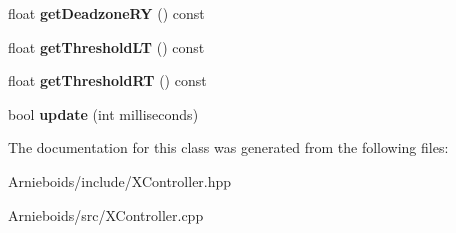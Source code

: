 \begin{DoxyCompactItemize}
\item 
\hypertarget{class_x_controller_abb171d26892efcc9ef5d4109a0e46644}{}float {\bfseries get\+Deadzone\+R\+Y} () const \label{class_x_controller_abb171d26892efcc9ef5d4109a0e46644}

\item 
\hypertarget{class_x_controller_a29521bc4c619301d8448cd9b1fa84bc4}{}float {\bfseries get\+Threshold\+L\+T} () const \label{class_x_controller_a29521bc4c619301d8448cd9b1fa84bc4}

\item 
\hypertarget{class_x_controller_a74406c5161e85934a0a25a11ca44fa96}{}float {\bfseries get\+Threshold\+R\+T} () const \label{class_x_controller_a74406c5161e85934a0a25a11ca44fa96}

\item 
\hypertarget{class_x_controller_addafe067b836a5b5d6cfa6a1d9ff72cb}{}bool {\bfseries update} (int milliseconds)\label{class_x_controller_addafe067b836a5b5d6cfa6a1d9ff72cb}

\end{DoxyCompactItemize}


The documentation for this class was generated from the following files\+:\begin{DoxyCompactItemize}
\item 
Arnieboids/include/X\+Controller.\+hpp\item 
Arnieboids/src/X\+Controller.\+cpp\end{DoxyCompactItemize}
